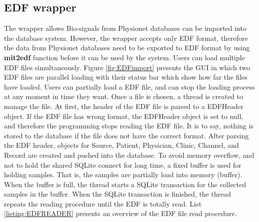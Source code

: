 \subsection{EDF wrapper}
The wrapper allows Bio-signals from Physionet databases can be imported into the database system. However, the wrapper accepts only EDF format, therefore the data from Physionet databases need to be exported to EDF format by using \textbf{mit2edf} function before it can be used by the system. Users can load multiple EDF files simultaneously. Figure \ref{fig:EDFimport} presents the GUI in which two EDF files are parallel loading with their status bar which show how far the files have loaded. Users can partially load a EDF file, and can stop the loading process at any moment in time they want. Once a file is chosen, a thread is created to manage the file. At first, the header of the EDF file is parsed to a EDFHeader object. If the EDF file has wrong format, the EDFHeader object is set to null, and therefore the programming stops reading the EDF file. It is to say, nothing is stored to the database if the file does not have the correct format. After parsing the EDF header, objects for Source, Patient, Physician, Clinic, Channel, and Record are created and pushed into the database. To avoid memory overflow, and not to hold the shared SQLite connect for long time, a fixed buffer is used for holding samples. That is, the samples are partially load into memory (buffer). When the buffer is full, the thread starts a SQLite transaction for the collected samples in the buffer. When the SQLite transaction is finished, the thread repeats the reading procedure until the EDF is totally read.
List \ref{listing:EDFREADER} presents an overview of the EDF file read procedure.
